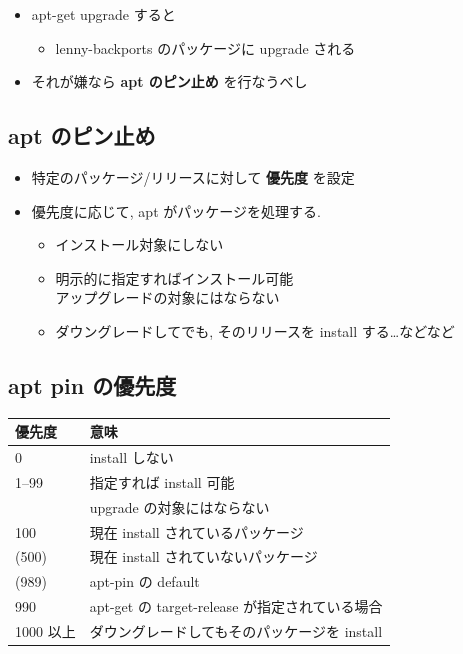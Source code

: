 \documentclass[mingoth,a4paper]{jsarticle}
\begin{document}
\begin{commandline}
\end{commandline}





\begin{itemize}
\item apt-get upgrade すると

\begin{itemize}
\item lenny-backports のパッケージに upgrade される
\end{itemize}
\item それが嫌なら \textbf{apt のピン止め} を行なうべし
\end{itemize}

\subsection{apt のピン止め}


\begin{itemize}
\item 特定のパッケージ/リリースに対して \textbf{優先度} を設定
\item 優先度に応じて, apt がパッケージを処理する.

\begin{itemize}
\item インストール対象にしない
\item 明示的に指定すればインストール可能\\
アップグレードの対象にはならない
\item ダウングレードしてでも, そのリリースを install する\dots{}などなど
\begin{center}
\end{center}
\end{itemize}
\end{itemize}






\subsection{apt pin の優先度}

\begin{tabular}{ll}
優先度 & 意味 \\
\hline
0 & install しない \\
1--99 & 指定すれば install 可能 \\
 & upgrade の対象にはならない \\
100 & 現在 install されているパッケージ \\
(500) & 現在 install されていないパッケージ \\
(989) & apt-pin の default \\
990 & apt-get の target-release が指定されている場合 \\
1000 以上 & ダウングレードしてもそのパッケージを install \\
\end{tabular}
\end{document}
